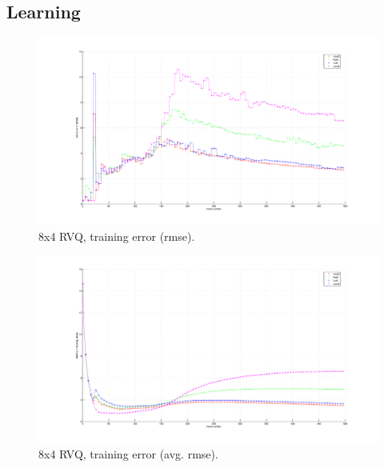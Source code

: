 \subsection{Learning}
								\begin{figure}[h!]
								\centering
								\includegraphics[height=0.4\textheight]{thesis/4_trellis70_8_4_1000_trg_rmse.pdf}
								\caption{8x4 RVQ, training error (rmse).}
								\label{fig:4_trellis70_8_4_1000_trg_rmse}
								\end{figure}


								\begin{figure}[h!]
								\centering
								\includegraphics[height=0.4\textheight]{thesis/4_trellis70_8_4_1000_trg_armse.pdf}
								\caption{8x4 RVQ, training error (avg. rmse).}
								\label{fig:4_trellis70_8_4_1000_trg_armse}
								\end{figure}

